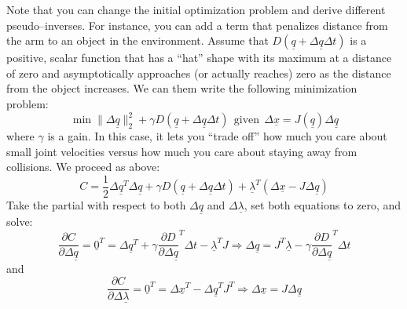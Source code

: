 \documentclass[]{article}
\begin{document}
Note that you can change the initial optimization problem and derive different pseudo--inverses. For instance, you can add a term that penalizes distance from the arm to an object in the environment. Assume that $D(\underline{q} + \Delta\underline{q}\Delta t)$ is a positive, scalar function that has a ``hat'' shape with its maximum at a distance of zero and asymptotically approaches (or actually reaches) zero as the distance from the object increases. We can them write the following minimization problem:
\begin{displaymath}
\min \|\Delta \underline{q}\|_{2}^{2} + \gamma D(\underline{q} + \Delta\underline{q}\Delta t)\ \ \text{given}\ \ 	\Delta \underline{x} = J(\underline{q})\Delta\underline{q}
\end{displaymath}
where $\gamma$ is a gain. In this case, it lets you ``trade off'' how much you care about small joint velocities versus how much you care about staying away from collisions. We proceed as above:
\begin{displaymath}
C = \frac{1}{2} \Delta \underline{q}^{T}\Delta\underline{q} + \gamma D(\underline{q} + \Delta\underline{q}\Delta t)+ \underline{\lambda}^{T}(\Delta\underline{x} - J\Delta\underline{q})
\end{displaymath}
Take the partial with respect to both $\Delta\underline{q}$ and $\Delta\underline{\lambda}$, set both equations to zero, and solve:
\begin{equation}
\frac{\partial C}{\partial \Delta\underline{q}} = \underline{0}^{T} = \Delta\underline{q}^{T} + \gamma \frac{\partial D}{\partial \Delta\underline{q}}^{T}\Delta t - \underline{\lambda}^{T}J \Rightarrow \Delta \underline{q}  = J^{T}\underline{\lambda} - \gamma \frac{\partial D}{\partial \Delta\underline{q}}^{T}\Delta t \label{fourth}
\end{equation}
and
\begin{equation}
	\frac{\partial C}{\partial \Delta\underline{\lambda}} = \underline{0}^{T} = \Delta\underline{x}^{T} - \Delta\underline{q}^{T}J^{T} \Rightarrow \Delta \underline{x} = J \Delta\underline{q} \label{fifth}
\end{equation}
\end{document}
